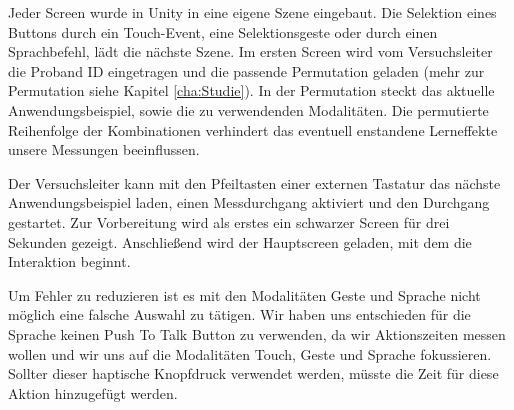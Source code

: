 Jeder Screen wurde in Unity in eine eigene Szene eingebaut.
Die Selektion eines Buttons durch ein Touch-Event, eine Selektionsgeste oder durch einen Sprachbefehl, lädt die nächste Szene. 
Im ersten Screen wird vom Versuchsleiter die Proband ID eingetragen und die passende Permutation geladen (mehr zur Permutation siehe Kapitel \ref{cha:Studie}). 
In der Permutation steckt das aktuelle Anwendungsbeispiel, sowie die zu verwendenden Modalitäten. 
Die permutierte Reihenfolge der Kombinationen verhindert das eventuell enstandene Lerneffekte unsere Messungen beeinflussen. 

Der Versuchsleiter kann mit den Pfeiltasten einer externen Tastatur das nächste Anwendungsbeispiel laden, einen Messdurchgang aktiviert und den Durchgang gestartet.  
Zur Vorbereitung wird als erstes ein schwarzer Screen für drei Sekunden gezeigt.
Anschließend wird der Hauptscreen geladen, mit dem die Interaktion beginnt.

Um Fehler zu reduzieren ist es mit den Modalitäten Geste und Sprache nicht möglich eine falsche Auswahl zu tätigen. 
Wir haben uns entschieden für die Sprache keinen Push To Talk Button zu verwenden, da wir Aktionszeiten messen wollen und wir uns auf die Modalitäten Touch, Geste und Sprache fokussieren. 
Sollter dieser haptische Knopfdruck verwendet werden, müsste die Zeit für diese Aktion hinzugefügt werden.  


